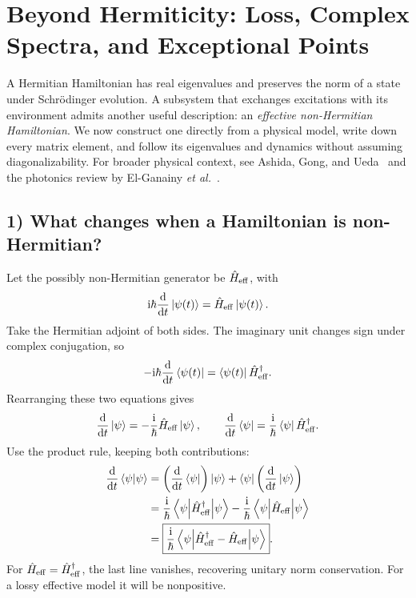 \section{Beyond Hermiticity: Loss, Complex Spectra, and Exceptional Points}
\label{sec:nh-two-cavities}
A Hermitian Hamiltonian has real eigenvalues and preserves the norm of a
state under Schr\"odinger evolution. A subsystem that exchanges
excitations with its environment admits another useful description:
an \emph{effective non-Hermitian Hamiltonian}. We now construct one
directly from a physical model, write down every matrix element, and
follow its eigenvalues and dynamics without assuming diagonalizability.
For broader physical context, see Ashida, Gong, and
Ueda~\cite{AshidaGongUeda2020} and the photonics review by
El-Ganainy \emph{et al.}~\cite{ElGanainy2018}.

\subsection*{1) What changes when a Hamiltonian is non-Hermitian?}
Let the possibly non-Hermitian generator be $\hat{H}_{\mathrm{eff}}$,
with
\begin{equation}
\mathrm{i}\hbar\frac{\mathrm{d}}{\mathrm{d} t}\left|\psi(t)\right\rangle
 =\hat{H}_{\mathrm{eff}}\left|\psi(t)\right\rangle.
\label{eq:nh-schro}
\end{equation}
Take the Hermitian adjoint of both sides. The imaginary unit changes
sign under complex conjugation, so
\begin{equation}
-\mathrm{i}\hbar\frac{\mathrm{d}}{\mathrm{d} t}\left\langle\psi(t)\right|
 =\left\langle\psi(t)\right|\hat{H}_{\mathrm{eff}}^\dagger.
\end{equation}
Rearranging these two equations gives
\begin{equation}
\frac{\mathrm{d}}{\mathrm{d} t}\left|\psi\right\rangle
 =-\frac{\mathrm{i}}{\hbar}\hat{H}_{\mathrm{eff}}\left|\psi\right\rangle,\qquad
\frac{\mathrm{d}}{\mathrm{d} t}\left\langle\psi\right|
 =\frac{\mathrm{i}}{\hbar}\left\langle\psi\right|\hat{H}_{\mathrm{eff}}^\dagger.
\end{equation}
Use the product rule, keeping both contributions:
\begin{align}
\frac{\mathrm{d}}{\mathrm{d} t}\left\langle\psi\middle|\psi\right\rangle
&=\left(\frac{\mathrm{d}}{\mathrm{d} t}\left\langle\psi\right|\right)\left|\psi\right\rangle+
  \left\langle\psi\right|\left(\frac{\mathrm{d}}{\mathrm{d} t}\left|\psi\right\rangle\right)\notag\\
&=\frac{\mathrm{i}}{\hbar}\left\langle\psi\middle|\hat{H}_{\mathrm{eff}}^\dagger\middle|\psi\right\rangle
 -\frac{\mathrm{i}}{\hbar}\left\langle\psi\middle|\hat{H}_{\mathrm{eff}}\middle|\psi\right\rangle\notag\\
&=\boxed{\frac{\mathrm{i}}{\hbar}
 \left\langle\psi\middle|\hat{H}_{\mathrm{eff}}^\dagger-\hat{H}_{\mathrm{eff}}\middle|\psi\right\rangle}.
\label{eq:nh-norm-identity}
\end{align}
For $\hat{H}_{\mathrm{eff}}=\hat{H}_{\mathrm{eff}}^\dagger$,
the last line vanishes, recovering unitary norm conservation.
For a lossy effective model it will be nonpositive.

